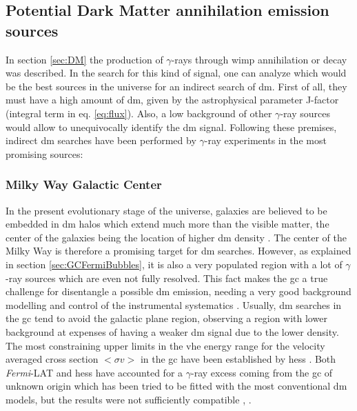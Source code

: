 \documentclass[main.tex]{subfiles}
\begin{document}
\subsection{Potential Dark Matter annihilation emission sources}

In section \ref{sec:DM} the production of $\gamma$-rays through \gls{wimp} annihilation or decay was described. In the search for this kind of signal, one can analyze which would be the best sources in the universe for an indirect search of \gls{dm}. First of all, they must have a high amount of \gls{dm}, given by the astrophysical parameter J-factor (integral term in eq. \ref{eq:flux}). Also, a low background of other $\gamma$-ray sources would allow to unequivocally identify the \gls{dm} signal. Following these premises, indirect \gls{dm} searches have been performed by $\gamma$-ray experiments in the most promising sources:\\

\subsubsection{Milky Way Galactic Center}

In the present evolutionary stage of the universe, galaxies are believed to be embedded in \gls{dm} halos which extend much more than the visible matter, the center of the galaxies being the location of higher \gls{dm} density \cite{navarro_1996}. The center of the Milky Way is therefore a promising target for \gls{dm} searches. However, as explained in section \ref{sec:GCFermiBubbles}, it is also a very populated region with a lot of $\gamma$-ray sources which are even not fully resolved. This fact makes the \gls{gc} a true challenge for disentangle a possible \gls{dm} emission, needing a very good background modelling and control of the instrumental systematics \cite{2019CTAScienceCase}. Usually, \gls{dm} searches in the \gls{gc} tend to avoid the galactic plane region, observing a region with lower background at expenses of having a weaker \gls{dm} signal due to the lower density.\\
The most constraining upper limits in the \gls{vhe} energy range for the velocity averaged cross section $<\sigma v>$ in the \gls{gc} have been established by \gls{hess} \cite{2011HESSGClimits}. Both \textit{Fermi}-LAT and \gls{hess} have accounted for a $\gamma$-ray excess coming from the \gls{gc} of unknown origin which has been tried to be fitted with the most conventional \gls{dm} models, but the results were not sufficiently compatible \cite{2006HESSGCexcess}, \cite{2017FermiGCexcess}.\\
\end{document}
